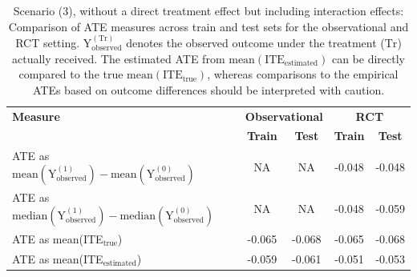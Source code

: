 \begin{table}[htbp]
\centering
\small
\caption{Scenario (3), without a direct treatment effect but including interaction effects: Comparison of ATE measures across train and test sets for the observational and RCT setting. $\text{Y}_\text{observed}^{(\text{Tr})}$ denotes the observed outcome under the treatment ($\text{Tr}$) actually received. The estimated ATE from $\text{mean}(\text{ITE}_\text{estimated})$ can be directly compared to the true $\text{mean}(\text{ITE}_\text{true})$, whereas comparisons to the empirical ATEs based on outcome differences should be interpreted with caution.}
\label{tab:scenario3_ate_comparison}
\begin{tabular}{l c c c c}
\toprule
\textbf{Measure} & \multicolumn{2}{c}{\textbf{Observational}} & \multicolumn{2}{c}{\textbf{RCT}} \\
\cmidrule(lr){2-3} \cmidrule(lr){4-5}
 & \textbf{Train} & \textbf{Test} & \textbf{Train} & \textbf{Test} \\
\midrule
ATE as $\text{mean}(\text{Y}_\text{observed}^{(1)}) - \text{mean}(\text{Y}_\text{observed}^{(0)})$ 
& NA & NA 
& -0.048 
& -0.048 \\

ATE as $\text{median}(\text{Y}_\text{observed}^{(1)}) - \text{median}(\text{Y}_\text{observed}^{(0)})$  
& NA & NA 
& -0.048 
& -0.059 \\

ATE as mean(ITE$_\text{true}$)  
& -0.065 
& -0.068 
& -0.065 
& -0.068 \\

ATE as mean(ITE$_\text{estimated}$) 
& -0.059 
& -0.061 
& -0.051 
& -0.053 \\
\bottomrule
\end{tabular}
\end{table}


